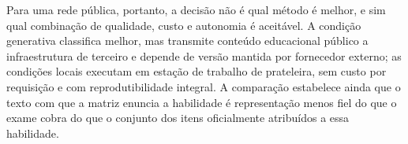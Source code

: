 Para uma rede pública, portanto, a decisão não é qual método é melhor, e sim
qual combinação de qualidade, custo e autonomia é aceitável. A condição
generativa classifica melhor, mas transmite conteúdo educacional público a
infraestrutura de terceiro e depende de versão mantida por fornecedor externo;
as condições locais executam em estação de trabalho de prateleira, sem custo
por requisição e com reprodutibilidade integral. A comparação estabelece ainda
que o texto com que a matriz enuncia a habilidade é representação menos fiel do
que o exame cobra do que o conjunto dos itens oficialmente atribuídos a essa
habilidade.
